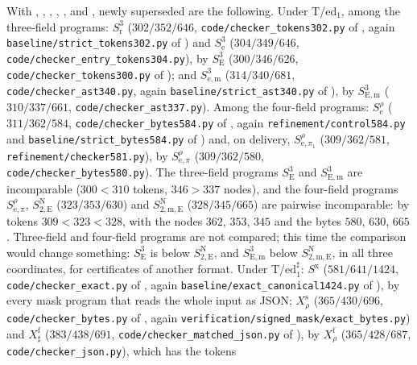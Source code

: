 With , , ,
, ,  and
, newly superseded are the following. Under T/ed$_1$, among the
three-field programs: $S^{3}_{\mathrm r}$ ($302/352/646$, \texttt{code/checker\_tokens302.py}
of , again \texttt{baseline/strict\_tokens302.py} of
) and $S^{3}_{\mathrm e}$ ($304/349/646$,
\texttt{code/checker\_entry\_tokens304.py}), by $S^{3}_{\mathrm E}$ ($300/346/626$,
\texttt{code/checker\_tokens300.py} of ); and $S^{3}_{\mathrm{e,m}}$
($314/340/681$, \texttt{code/checker\_ast340.py}, again \texttt{baseline/strict\_ast340.py}
of ), by $S^{3}_{\mathrm{E,m}}$ ($310/337/661$,
\texttt{code/checker\_ast337.py}). Among the four-field programs: $S^{\rho}_{\mathrm e}$
($311/362/584$, \texttt{code/checker\_bytes584.py} of , again
\texttt{refinement/control584.py} and \texttt{baseline/strict\_bytes584.py} of
) and, on delivery, $S^{\rho}_{\mathrm e,\pi_1}$
($309/362/581$, \texttt{refinement/checker581.py}), by $S^{\rho}_{\mathrm e,\pi}$
($309/362/580$, \texttt{code/checker\_bytes580.py}). The three-field programs
$S^{3}_{\mathrm E}$ and $S^{3}_{\mathrm{E,m}}$ are incomparable ($300<310$ tokens,
$346>337$ nodes), and the four-field programs $S^{\rho}_{\mathrm e,\pi}$,
$S^{\mathrm N}_{2,\mathrm E}$ ($323/353/630$) and $S^{\mathrm N}_{2,\mathrm{m,E}}$
($328/345/665$) are pairwise incomparable: by tokens $309<323<328$, with the nodes $362$,
$353$, $345$ and the bytes $580$, $630$, $665$. Three-field and four-field programs are not
compared; this time the comparison would change something: $S^{3}_{\mathrm E}$ is below
$S^{\mathrm N}_{2,\mathrm E}$, and $S^{3}_{\mathrm{E,m}}$ below $S^{\mathrm N}_{2,\mathrm{m,E}}$,
in all three coordinates, for certificates of another format. Under T/ed$_1^{\sharp}$: $S^{\mathrm x}$ ($581/641/1424$,
\texttt{code/checker\_exact.py} of , again
\texttt{baseline/exact\_canonical1424.py} of ), by every mask
program that reads the whole input as JSON; $X^{\mathrm s}_{\rho}$ ($365/430/696$,
\texttt{code/checker\_bytes.py} of , again
\texttt{verification/signed\_mask/exact\_bytes.py}) and $X^{\mathrm f}_{\sharp}$
($383/438/691$, \texttt{code/checker\_matched\_json.py} of ), by
$X^{\mathrm f}_{\rho}$ ($365/428/687$, \texttt{code/checker\_json.py}), which has the tokens
